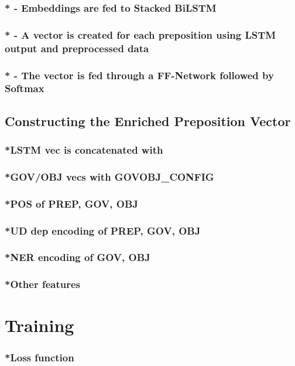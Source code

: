 \subsubsection{* - Embeddings are fed to Stacked BiLSTM}
\subsubsection{* - A vector is created for each preposition using LSTM output and preprocessed data}
\subsubsection{* - The vector is fed through a FF-Network followed by Softmax}
\pagebreak
\subsection{Constructing the Enriched Preposition Vector}
\subsubsection{*LSTM vec is concatenated with}
\subsubsection{*GOV/OBJ vecs with GOVOBJ\_CONFIG}
\subsubsection{*POS of PREP, GOV, OBJ}
\subsubsection{*UD dep encoding of PREP, GOV, OBJ}
\subsubsection{*NER encoding of GOV, OBJ}
\subsubsection{*Other features}

\section{Training} \label{sec:psstraining}
\subsubsection{*Loss function}
